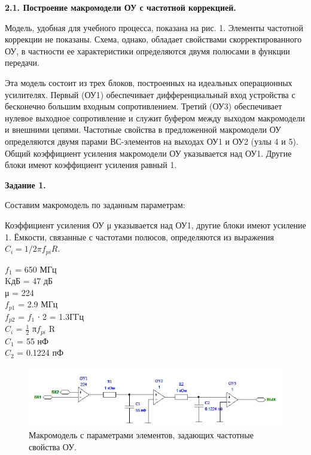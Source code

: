 \documentclass[a4paper,14pt]{extarticle}
\begin{document}
    \newpage
    \begin{center}
        \textbf{2.1. Построение макромодели ОУ с частотной коррекцией.}
    \end{center}
    
    Модель, удобная для учебного процесса, показана на рис. 1. Элементы 
    частотной коррекции не показаны. Схема, однако, обладает свойствами 
    скорректированного ОУ, в частности ее характеристики определяются 
    двумя полюсами в функции передачи.

    Эта модель состоит из трех блоков, построенных на идеальных 
    операционных усилителях. Первый (ОУ1) обеспечивает дифференциальный 
    вход устройства с бесконечно большим входным сопротивлением. Третий 
    (ОУ3) обеспечивает нулевое выходное сопротивление и служит буфером 
    между выходом макромодели и внешними цепями. Частотные свойства в 
    предложенной макромодели ОУ определяются двумя парами ВС-элементов на 
    выходах ОУ1 и ОУ2 (узлы 4 и 5). Общий коэффициент усиления макромодели 
    ОУ указывается над ОУ1. Другие блоки имеют коэффициент усиления равный 1.

    \newpage

    \begin{center}
        \textbf{Задание 1.}
    \end{center}

    Составим макромодель по заданным параметрам:

    Коэффициент усиления ОУ μ указывается над ОУ1, другие блоки имеют 
    усиление 1. Ёмкости, связанные с частотами полюсов, определяются из 
    выражения $C_i=1/2πf_{pi}R$.\\
    \vspace{-1cm}
    \begin{multicols}{2}
    \noindent $f_1$ = 650 МГц\\
    KдБ = 47 дБ\\
    μ = 224\\
    \columnbreak
    $f_{p1}$ = 2.9 МГц\\
    $f_{p2}$ = $f_1$ ∙ 2 = 1.3ГГц\\
    $C_i$ = $\frac{1}{2}$ \cdot π\cdot $f_{pi}$ \cdot R\\
    $C_1$ = 55 нФ\\
    $C_2$ = 0.1224 пФ\\
    \end{multicols}
    \begin{figure}[h!]
        \begin{center}
            \includegraphics[scale=0.9]{1.png}
            \caption{Макромодель с параметрами элементов, задающих частотные свойства ОУ.}
        \end{center}
    \end{figure}
\end{document}
